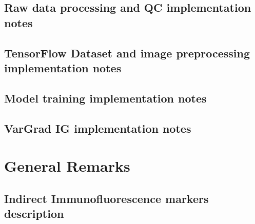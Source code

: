 \documentclass[biblatexBackend=bibtex]{tumthesis}
\begin{document}
\section{Raw data processing and QC implementation notes}
\label{sec:appendix:raw_data}


\section{TensorFlow Dataset and image preprocessing implementation notes}
\label{sec:appendix:tfds}


\section{Model training implementation notes}
\label{sec:appendix:Model_training_IN}


\section{VarGrad IG implementation notes}
\label{sec:appendix:VarGrad_IG_Experimental_Setup}


\chapter{General Remarks}
\label{Appendix-general-remarks}


\section{Indirect Immunofluorescence markers description}
\label{sec:appendix:if_markers}


\backmatter


\listoffigures

\vspace*{1.5cm}
\end{document}
